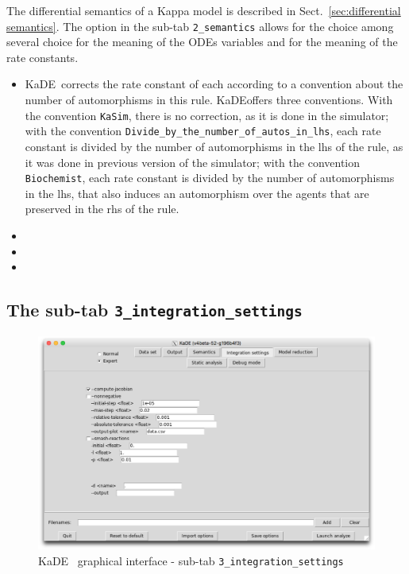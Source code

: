 \documentclass[11pt]{book}
\def\KaDE{\textsf{KaDE}}
\begin{document}
The differential semantics of a Kappa model is described in Sect.~\ref{sec:differential semantics}. The option in the sub-tab \texttt{2\_semantics} allows for the choice among several choice for the meaning of the ODEs variables and for the meaning of the rate constants.


\begin{itemize}
  \item \KaDE~corrects the rate constant of each  according to a convention about the number of automorphisms in this rule.
  \KaDE offers three conventions. With the convention \texttt{KaSim}, there is no correction, as it is done in the simulator; with the convention \texttt{Divide\_by\_the\_number\_of\_autos\_in\_lhs}, each rate constant is divided by the number of automorphisms in the lhs of the rule, as it was done in previous version of the simulator;
  with the convention \texttt{Biochemist}, each rate constant is divided
  by the number of automorphisms in the lhs, that also induces an automorphism over the agents that are preserved in the rhs of the rule.
  \item
  \item
  \item

\end{itemize}


\subsection{The sub-tab \texttt{3\_integration\_settings}}

\begin{figure}[htbp]
\centering
\includegraphics[width=12cm,bb=0 0 1904 1208]{img/kade_3.png}
\caption{\KaDE~ graphical interface - sub-tab \texttt{3\_integration\_settings}}
\label{fig:kade:3}
\end{figure}
\end{document}
